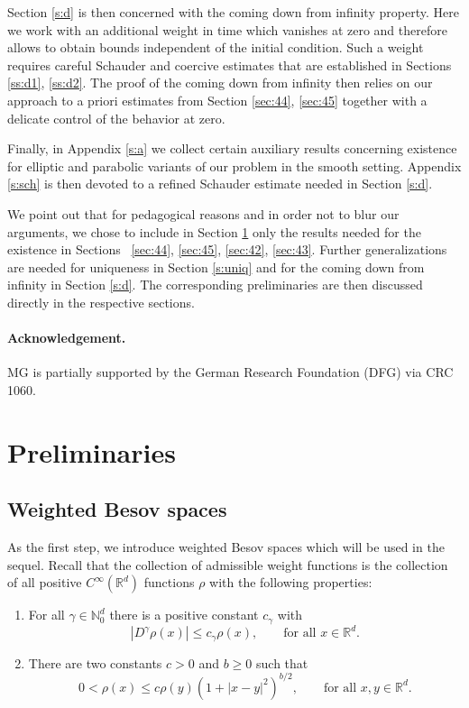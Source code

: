\documentclass[a4paper,11pt]{article}
\renewcommand{\geq}{\geqslant}
\numberwithin{equation}{section}
\newcommand{\8}{\infty}
\begin{document}
Section \ref{s:d} is then concerned with the coming down from infinity property. Here we work with an additional weight in time which vanishes at zero and therefore allows to obtain bounds independent of the initial condition. Such a weight requires careful Schauder and coercive estimates that are established in Sections \ref{ss:d1}, \ref{ss:d2}. The proof of the coming down from infinity  then relies on our approach to a priori estimates from Section \ref{sec:44}, \ref{sec:45} together with a delicate control of the behavior at zero.

Finally, in Appendix \ref{s:a} we collect certain auxiliary results concerning existence for elliptic and parabolic variants of our problem in the smooth setting. Appendix \ref{s:sch} is then devoted to a refined Schauder estimate needed in Section \ref{s:d}.




We point out that for pedagogical reasons and in order not to blur our arguments, we chose to include in  Section \ref{s:prel}  only the results needed for the existence in Sections ~\ref{sec:44}, \ref{sec:45}, \ref{sec:42}, \ref{sec:43}. Further generalizations are  needed for uniqueness in Section \ref{s:uniq} and for the coming down from infinity in Section \ref{s:d}. The corresponding preliminaries are then discussed directly in the respective sections.


\paragraph{Acknowledgement.} MG is partially supported by the German Research Foundation (DFG) via CRC 1060.
 



\section{Preliminaries}
\label{s:prel}

\subsection{Weighted Besov spaces}
\label{ssec:besov}


As the first step, we introduce weighted Besov spaces which will be used in the sequel. Recall that the collection of  admissible weight functions is the collection of all positive $C^\infty(\mathbb{R}^d)$ functions $\rho$ with the following properties:
\begin{enumerate}
\item For all $\gamma\in\mathbb{N}_0^d$ there is a positive constant $c_\gamma$ with
$$
|D^\gamma\rho(x)|\leqslant c_\gamma \rho(x),\qquad\text{for all }x\in\mathbb{R}^d.
$$
\item There are two constants $c>0$ and $b\geq 0$ such that
$$
0<\rho(x)\leqslant c\rho(y)(1+|x-y|^2)^{b/2},\qquad\text{for all }x,y\in\mathbb{R}^d.
$$
\end{enumerate}
\end{document}
